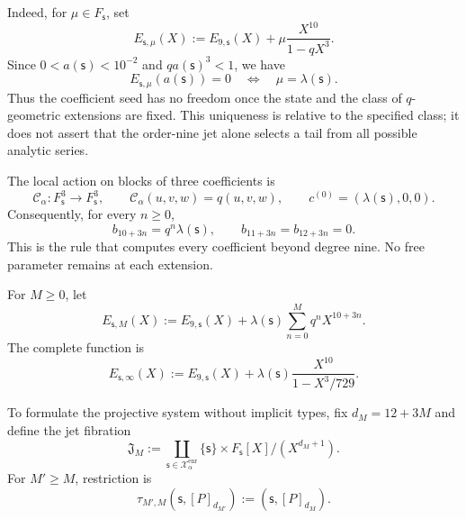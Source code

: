 Indeed, for \(\mu\in F_{\mathsf s}\), set
\[
 E_{\mathsf s,\mu}(X)
 :=E_{9,\mathsf s}(X)+\mu\frac{X^{10}}{1-qX^3}.
\]
Since \(0<a(\mathsf s)<10^{-2}\) and \(qa(\mathsf s)^3<1\), we have
\begin{equation}
 E_{\mathsf s,\mu}(a(\mathsf s))=0
 \quad\Longleftrightarrow\quad
 \mu=\lambda(\mathsf s).
 \label{eq:alpha-unicidad-lambda-clase-geometrica}
\end{equation}
Thus the coefficient seed has no freedom once the state and the class
of \(q\)-geometric extensions are fixed. This uniqueness is relative to
the specified class; it does not assert that the order-nine jet alone selects
a tail from all possible analytic series.

The local action on blocks of three coefficients is
\begin{equation}
 \mathcal C_\alpha:F_{\mathsf s}^{3}\longrightarrow F_{\mathsf s}^{3},
 \qquad \mathcal C_\alpha(u,v,w)=q(u,v,w),
 \qquad c^{(0)}=(\lambda(\mathsf s),0,0).
 \label{eq:alpha-accion-coeficientes}
\end{equation}
Consequently, for every \(n\geq0\),
\begin{equation}
 b_{10+3n}=q^n\lambda(\mathsf s),\qquad
 b_{11+3n}=b_{12+3n}=0.
 \label{eq:alpha-recurrencia-coeficientes}
\end{equation}
This is the rule that computes every coefficient beyond degree nine.
No free parameter remains at each extension.

For \(M\geq0\), let
\begin{equation}
 E_{\mathsf s,M}(X):=E_{9,\mathsf s}(X)
 +\lambda(\mathsf s)\sum_{n=0}^{M}q^nX^{10+3n}.
 \label{eq:alpha-truncamientos-completos}
\end{equation}
The complete function is
\begin{equation}
 E_{\mathsf s,\infty}(X)
 :=E_{9,\mathsf s}(X)
 +\lambda(\mathsf s)\frac{X^{10}}{1-X^3/729}.
 \label{eq:alpha-funcion-completa-explicita}
\end{equation}

To formulate the projective system without implicit types, fix
\(d_M=12+3M\) and define the jet fibration
\begin{equation}
 \mathfrak J_M:=
 \coprod_{\mathsf s\in\mathcal X_\alpha^{\mathrm{enr}}}
 \{\mathsf s\}\times F_{\mathsf s}[X]/(X^{d_M+1}).
 \label{eq:alpha-espacio-jets-rev08}
\end{equation}
For \(M'\ge M\), restriction is
\begin{equation}
 \tau_{M',M}(\mathsf s,[P]_{d_{M'}})
 :=(\mathsf s,[P]_{d_M}).
 \label{eq:alpha-truncamiento-jets-rev08}
\end{equation}

